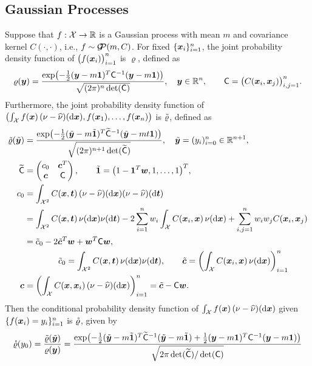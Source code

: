 \documentclass[graybox,footinfo]{svmult}
\DeclareMathOperator{\GP}{\cg\!\!\cp}
\begin{document}
\subsection{Gaussian Processes}
Suppose that $f:\cx \to \R$ is a Gaussian process with mean $m$ and covariance kernel $C(\cdot,\cdot)$, i.e., $f \sim \GP(m,C)$.  For fixed $\{\bsx_i\}_{i=1}^n$, the joint probability density function of $\bigl(f(\bsx_i)\bigr)_{i=1}^n$ is $\varrho$, defined as 
\begin{equation*}
\varrho (\bsy) = \frac{\exp\bigl(-\frac 12 (\bsy - m \bsone)^T \mC^{-1} (\bsy - m \bsone) \bigr)}{\sqrt{(2 \pi)^n \det(\mC)}}, \quad \bsy \in \R^n, \qquad \mC = \bigl(C(\bsx_i,\bsx_j)\bigr)_{i,j=1}^n.
\end{equation*}
Furthermore, the joint probability density function of $\bigl(\int_{\cx} f(\bsx) \, (\nu -\hnu)(\D \bsx), f(\bsx_1), \ldots, f(\bsx_n)\bigr)$ is $\tvarrho$, defined as 
\begin{align*}
\tvarrho (\tbsy) &= \frac{\exp\bigl(-\frac 12 (\tbsy - m \tbsone)^T \tmC^{-1} (\tbsy - m t\bsone) \bigr)}{\sqrt{(2 \pi)^{n+1} \det(\tmC)}}, \quad \tbsy = (y_i)_{i=0}^n \in \R^{n+1}, \\
 \tmC &= \begin{pmatrix} c_0 & \bsc^T \\ \bsc & \mC \end{pmatrix}, \qquad \tbsone = \bigl(1 - \bsone^T\bsw,  1, \ldots, 1 \bigr)^T, \\
 c_0 &= \int_{\cx^2} C(\bsx,\bst) \, (\nu -\hnu)(\D\bsx)(\nu -\hnu)(\D\bst) \\ 
 & = \int_{\cx^2} C(\bsx,\bst) \, \nu (\D\bsx)\nu(\D\bst) - 2 \sum_{i=1}^n w_i \int_{\cx} C(\bsx_i,\bsx) \, \nu (\D\bsx) +  \sum_{i,j=1}^n w_i w_j C(\bsx_i,\bsx_j)\\
 & = \tc_0 -2 \tbsc^T \bsw + \bsw^T \mC \bsw,\\
 & \qquad \qquad   \tc_0 = \int_{\cx^2} C(\bsx,\bst) \, \nu (\D\bsx)\nu(\D\bst), \qquad 
 \tbsc = \biggl( \int_{\cx} C(\bsx_i,\bsx) \, \nu (\D\bsx)\biggr)_{i=1}^n \\
 \bsc &= \biggl( \int_{\cx} C(\bsx,\bsx_i) \, (\nu -\hnu)(\D \bsx)\biggr)_{i=1}^n 
 =  \tbsc - \mC \bsw.
\end{align*}
Then the conditional probability density function of $\int_{\cx} f(\bsx) \,  (\nu -\hnu)(\D \bsx)$ given $\{f(\bsx_i )= y_i\}_{i=1}^n$ is $\rvarrho$, given by
\begin{equation*}
\rvarrho(y_0)  = \frac{\tvarrho(\tbsy)}{\varrho(\bsy)}  = \frac{\exp\bigl(-\frac 12 (\tbsy - m \tbsone)^T \tmC^{-1} (\tbsy - m \tbsone) + \frac 12 (\bsy - m \bsone)^T \mC^{-1} (\bsy - m \bsone)\bigr)}{\sqrt{2 \pi \det(\tmC)/\det(\mC)}}
\end{equation*}
\end{document}

